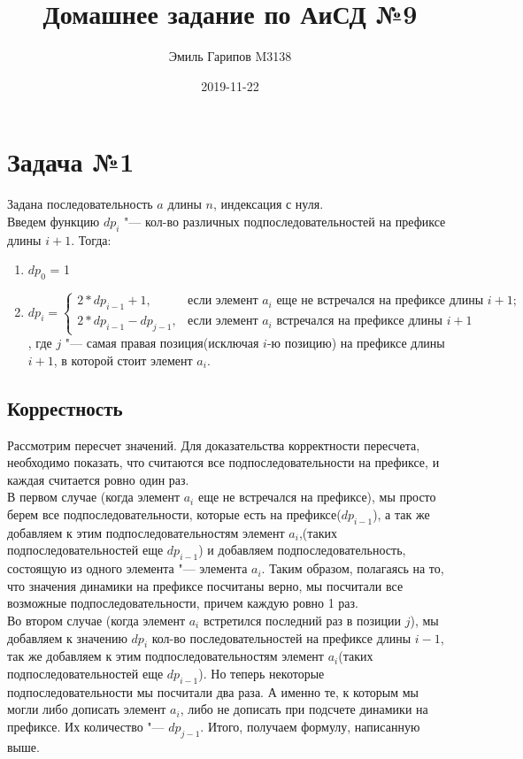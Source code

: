 \documentclass{article}
\title{Домашнее задание по АиСД №9}
\date{2019-11-22}
\author{Эмиль Гарипов M3138}
\begin{document}

\maketitle
\newpage
{}

\section*{Задача №1}
Задана последовательность $a$ длины $n$, индексация с нуля.\\
Введем функцию $dp_i$ "--- кол-во различных подпоследовательностей на префиксе длины $i + 1$. Тогда:
\begin{enumerate}
	\item[] {$dp_0$ = 1} 
	\item[] {$$
		dp_i =\begin{cases}
		2 * dp_{i - 1} + 1,&\text{если элемент $a_i$ еще не встречался на префиксе длины $i + 1$;}\\
		2*dp_{i - 1} - dp_{j - 1},&\text{если элемент $a_i$ встречался на префиксе длины $i + 1$}
		\end{cases}
		$$
		, где $j$ "--- самая правая позиция(исключая $i$-ю позицию) на префиксе длины $i + 1$, в которой стоит элемент $a_i$. 
	
}
\end{enumerate}
 

\subsection*{Коррестность}
Рассмотрим пересчет значений. Для доказательства корректности пересчета, необходимо показать, что считаются все подпоследовательности на префиксе, и каждая считается ровно один раз.\\
В первом случае (когда элемент $a_i$ еще не встречался на префиксе), мы просто берем все подпоследовательности, которые есть на префиксе($dp_{i - 1}$), а так же добавляем к этим подпоследовательностям элемент $a_i$,(таких подпоследовательностей еще $dp_{i - 1}$) и добавляем подпоследовательность, состоящую из одного элемента "--- элемента $a_i$. Таким образом, полагаясь на то, что значения динамики на префиксе посчитаны верно, мы посчитали все возможные подпоследовательности, причем каждую ровно 1 раз.\\
Во втором случае (когда элемент $a_i$ встретился последний раз в позиции $j$), мы добавляем к значению $dp_i$ кол-во последовательностей на префиксе длины $i - 1$, так же добавляем к этим подпоследовательностям элемент $a_i$(таких подпоследовательностей еще $dp_{i - 1}$). Но теперь некоторые подпоследовательности мы посчитали два раза. А именно те, к которым мы могли либо дописать элемент $a_i$, либо не дописать при подсчете динамики на префиксе. Их количество "--- $dp_{j - 1}$.  Итого, получаем формулу, написанную выше. 
\end{document}
